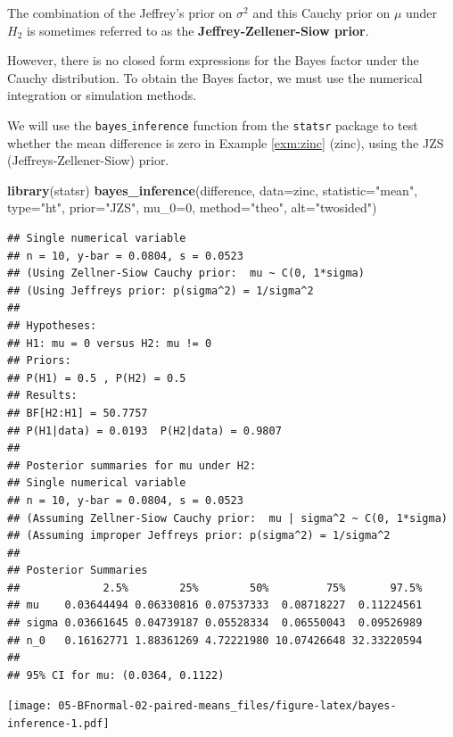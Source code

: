 \documentclass[]{book}
\newenvironment{Shaded}{\begin{snugshade}}{\end{snugshade}}
\newcommand{\KeywordTok}[1]{\textcolor[rgb]{0.13,0.29,0.53}{\textbf{{#1}}}}
\newcommand{\DataTypeTok}[1]{\textcolor[rgb]{0.13,0.29,0.53}{{#1}}}
\newcommand{\DecValTok}[1]{\textcolor[rgb]{0.00,0.00,0.81}{{#1}}}
\newcommand{\StringTok}[1]{\textcolor[rgb]{0.31,0.60,0.02}{{#1}}}
\newcommand{\NormalTok}[1]{{#1}}
\theoremstyle{definition}
\theoremstyle{definition}
\theoremstyle{definition}
\theoremstyle{remark}
\begin{document}
The combination of the Jeffrey's prior on \(\sigma^2\) and this Cauchy
prior on \(\mu\) under \(H_2\) is sometimes referred to as the
\textbf{Jeffrey-Zellener-Siow prior}.

However, there is no closed form expressions for the Bayes factor under
the Cauchy distribution. To obtain the Bayes factor, we must use the
numerical integration or simulation methods.

We will use the \texttt{bayes$\_$inference} function from the
\texttt{statsr} package to test whether the mean difference is zero in
Example \ref{exm:zinc} (zinc), using the JZS (Jeffreys-Zellener-Siow)
prior.

\begin{Shaded}
\begin{Highlighting}[]
\KeywordTok{library}\NormalTok{(statsr)}
\KeywordTok{bayes_inference}\NormalTok{(difference, }\DataTypeTok{data=}\NormalTok{zinc, }\DataTypeTok{statistic=}\StringTok{"mean"}\NormalTok{, }\DataTypeTok{type=}\StringTok{"ht"}\NormalTok{,}
                \DataTypeTok{prior=}\StringTok{"JZS"}\NormalTok{, }\DataTypeTok{mu_0=}\DecValTok{0}\NormalTok{, }\DataTypeTok{method=}\StringTok{"theo"}\NormalTok{, }\DataTypeTok{alt=}\StringTok{"twosided"}\NormalTok{)}
\end{Highlighting}
\end{Shaded}

\begin{verbatim}
## Single numerical variable
## n = 10, y-bar = 0.0804, s = 0.0523
## (Using Zellner-Siow Cauchy prior:  mu ~ C(0, 1*sigma)
## (Using Jeffreys prior: p(sigma^2) = 1/sigma^2
## 
## Hypotheses:
## H1: mu = 0 versus H2: mu != 0
## Priors:
## P(H1) = 0.5 , P(H2) = 0.5
## Results:
## BF[H2:H1] = 50.7757
## P(H1|data) = 0.0193  P(H2|data) = 0.9807 
## 
## Posterior summaries for mu under H2:
## Single numerical variable
## n = 10, y-bar = 0.0804, s = 0.0523
## (Assuming Zellner-Siow Cauchy prior:  mu | sigma^2 ~ C(0, 1*sigma)
## (Assuming improper Jeffreys prior: p(sigma^2) = 1/sigma^2
## 
## Posterior Summaries
##             2.5%        25%        50%         75%       97.5%
## mu    0.03644494 0.06330816 0.07537333  0.08718227  0.11224561
## sigma 0.03661645 0.04739187 0.05528334  0.06550043  0.09526989
## n_0   0.16162771 1.88361269 4.72221980 10.07426648 32.33220594
## 
## 95% CI for mu: (0.0364, 0.1122)
\end{verbatim}

\texttt{[image: 05-BFnormal-02-paired-means\_files/figure-latex/bayes-inference-1.pdf]}
\end{document}
